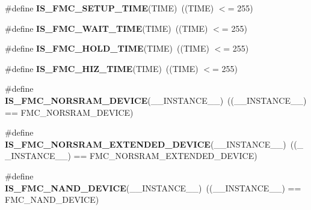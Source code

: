 \begin{DoxyCompactItemize}
\item 
\#define {\bfseries I\+S\+\_\+\+F\+M\+C\+\_\+\+S\+E\+T\+U\+P\+\_\+\+T\+I\+ME}(T\+I\+ME)~((T\+I\+ME) $<$= 255)\hypertarget{group___f_s_m_c___l_l___assert___macros_gae92dd426b69bdff01082535263b1f327}{}\label{group___f_s_m_c___l_l___assert___macros_gae92dd426b69bdff01082535263b1f327}

\item 
\#define {\bfseries I\+S\+\_\+\+F\+M\+C\+\_\+\+W\+A\+I\+T\+\_\+\+T\+I\+ME}(T\+I\+ME)~((T\+I\+ME) $<$= 255)\hypertarget{group___f_s_m_c___l_l___assert___macros_gac17d5f6befbefde0d0fbf2fa8652db9b}{}\label{group___f_s_m_c___l_l___assert___macros_gac17d5f6befbefde0d0fbf2fa8652db9b}

\item 
\#define {\bfseries I\+S\+\_\+\+F\+M\+C\+\_\+\+H\+O\+L\+D\+\_\+\+T\+I\+ME}(T\+I\+ME)~((T\+I\+ME) $<$= 255)\hypertarget{group___f_s_m_c___l_l___assert___macros_ga442df085b01885dec50cd82ffeaf03b4}{}\label{group___f_s_m_c___l_l___assert___macros_ga442df085b01885dec50cd82ffeaf03b4}

\item 
\#define {\bfseries I\+S\+\_\+\+F\+M\+C\+\_\+\+H\+I\+Z\+\_\+\+T\+I\+ME}(T\+I\+ME)~((T\+I\+ME) $<$= 255)\hypertarget{group___f_s_m_c___l_l___assert___macros_ga429934fc9167ecda68c704a86c35a31f}{}\label{group___f_s_m_c___l_l___assert___macros_ga429934fc9167ecda68c704a86c35a31f}

\item 
\#define {\bfseries I\+S\+\_\+\+F\+M\+C\+\_\+\+N\+O\+R\+S\+R\+A\+M\+\_\+\+D\+E\+V\+I\+CE}(\+\_\+\+\_\+\+I\+N\+S\+T\+A\+N\+C\+E\+\_\+\+\_\+)~((\+\_\+\+\_\+\+I\+N\+S\+T\+A\+N\+C\+E\+\_\+\+\_\+) == F\+M\+C\+\_\+\+N\+O\+R\+S\+R\+A\+M\+\_\+\+D\+E\+V\+I\+CE)\hypertarget{group___f_s_m_c___l_l___assert___macros_gafc79ec87631dad2edba9be9334bf100d}{}\label{group___f_s_m_c___l_l___assert___macros_gafc79ec87631dad2edba9be9334bf100d}

\item 
\#define {\bfseries I\+S\+\_\+\+F\+M\+C\+\_\+\+N\+O\+R\+S\+R\+A\+M\+\_\+\+E\+X\+T\+E\+N\+D\+E\+D\+\_\+\+D\+E\+V\+I\+CE}(\+\_\+\+\_\+\+I\+N\+S\+T\+A\+N\+C\+E\+\_\+\+\_\+)~((\+\_\+\+\_\+\+I\+N\+S\+T\+A\+N\+C\+E\+\_\+\+\_\+) == F\+M\+C\+\_\+\+N\+O\+R\+S\+R\+A\+M\+\_\+\+E\+X\+T\+E\+N\+D\+E\+D\+\_\+\+D\+E\+V\+I\+CE)\hypertarget{group___f_s_m_c___l_l___assert___macros_gaa2787b85b3e1e61eb35f81c941b61907}{}\label{group___f_s_m_c___l_l___assert___macros_gaa2787b85b3e1e61eb35f81c941b61907}

\item 
\#define {\bfseries I\+S\+\_\+\+F\+M\+C\+\_\+\+N\+A\+N\+D\+\_\+\+D\+E\+V\+I\+CE}(\+\_\+\+\_\+\+I\+N\+S\+T\+A\+N\+C\+E\+\_\+\+\_\+)~((\+\_\+\+\_\+\+I\+N\+S\+T\+A\+N\+C\+E\+\_\+\+\_\+) == F\+M\+C\+\_\+\+N\+A\+N\+D\+\_\+\+D\+E\+V\+I\+CE)\hypertarget{group___f_s_m_c___l_l___assert___macros_gad89e84c79ff91fd8f9f6ed5243321484}{}\label{group___f_s_m_c___l_l___assert___macros_gad89e84c79ff91fd8f9f6ed5243321484}


\end{DoxyCompactItemize}
